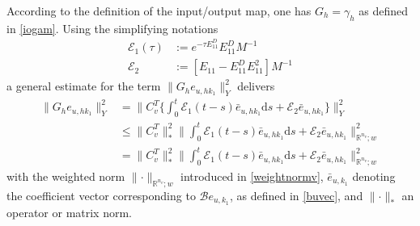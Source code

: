 \documentclass[a4paper,10pt,BCOR=15mm]{scrbook}
\providecommand{\norm}[1]{\lVert#1 \rVert}
\providecommand{\inva}[1]{\text{d} #1}
\begin{document}
According to the definition of the input/output map, one has $G_h = \gamma_h$ as defined in \eqref{iogam}. Using the simplifying notations
\begin{align*}
  \mathscr E_1(\tau)  &:= e^{-\tau E_{11}^D}E_{11}^D M^{-1} \\
\mathscr E_2 \quad &:= [E_{11} -E_{11}^DE_{11}^2]M^{-1}
\end{align*}
a general estimate for the term $\norm{G_h e_{u,hk_1}}_Y ^2$ delivers
\begin{align}
 \norm{G_h e_{u,hk_1}}_Y ^2 &= \norm { C_v^T \Big \lbrace \int_0^t \mathscr E_1(t-s)\bar e_{u,hk_1}\inva s +\mathscr E_2 \bar e_{u,hk_1}\Big \rbrace }_Y ^2\\
&\leq \norm { C_v^T}_*^2 \norm{  \int_0^t \mathscr E_1(t-s)\bar e_{u,hk_1}\inva s +\mathscr E_2\bar  e_{u,hk_1} }_{\mathbb R ^ {n_v};w}^2 \\
&= \norm { C_v^T}_*^2 \norm{  \int_0^t \mathscr E_1(t-s)\bar e_{u,hk_1}\inva s +\mathscr E_2 \bar e_{u,hk_1} }_{\mathbb R ^ {n_v};w}^2
\end{align}
with the weighted norm $\norm{\cdot}_{\mathbb R ^ {n_v};w} $ introduced in \eqref{weightnormv}, $\bar e_{u,k_1}$ denoting the coefficient vector corresponding to $\mathcal Be_{u,k_1}$, as defined in \eqref{buvec}, and $\norm{ \cdot }_*$ an operator or matrix norm.
\end{document}
